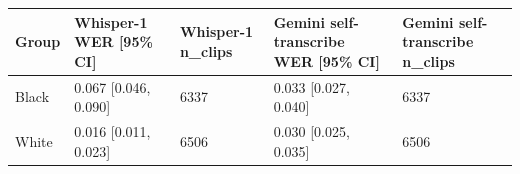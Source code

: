 \begin{tabular}{lllll}
\toprule
Group & Whisper-1 WER [95\% CI] & Whisper-1 n\_clips & Gemini self-transcribe WER [95\% CI] & Gemini self-transcribe n\_clips \\
\midrule
Black & 0.067 [0.046, 0.090] & 6337 & 0.033 [0.027, 0.040] & 6337 \\
White & 0.016 [0.011, 0.023] & 6506 & 0.030 [0.025, 0.035] & 6506 \\
\bottomrule
\end{tabular}
